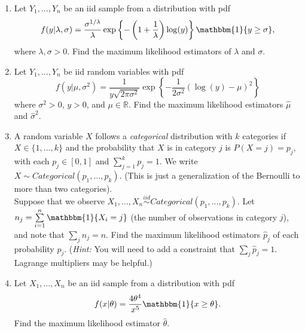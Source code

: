 \documentclass[11pt]{article}
\begin{document}
\begin{enumerate}
\item Let $Y_1,...,Y_n$ be an iid sample from a distribution with pdf 
$$f(y | \lambda, \sigma) = \dfrac{\sigma^{1/\lambda}}{\lambda} \exp \left\lbrace -\left(1 + \frac{1}{\lambda}\right) \log(y) \right\rbrace \mathbbm{1}\{ y \geq \sigma \},$$
where $\lambda, \sigma > 0$. Find the maximum likelihood estimators of $\lambda$ and $\sigma$.\\

\hspace{1cm}

\item Let $Y_1,...,Y_n$ be iid random variables with pdf
$$f(y|\mu, \sigma^2) = \frac{1}{y \sqrt{2 \pi \sigma^2}} \exp \left\lbrace -\frac{1}{2\sigma^2}(\log(y) - \mu)^2 \right\rbrace$$
where $\sigma^2 > 0$, $y > 0$, and $\mu \in \mathbb{R}$. Find the maximum likelihood estimators $\widehat{\mu}$ and $\widehat{\sigma}^2$.\\

\hspace{1cm}

\item A random variable $X$ follows a \textit{categorical} distribution with $k$ categories if $X \in \{1,...,k\}$ and the probability that $X$ is in category $j$ is $P(X = j) = p_j$, with each $p_j \in [0,1]$ and $\sum \limits_{j=1}^k p_j = 1$. We write $X \sim Categorical(p_1,...,p_k)$. (This is just a generalization of the Bernoulli to more than two categories).\\

\noindent Suppose that we observe $X_1,...,X_n \overset{iid}{\sim} Categorical(p_1,...,p_k)$. Let $n_j = \sum \limits_{i=1}^n  \mathbbm{1}\{X_i = j\}$ (the number of observations in category $j$), and note that $\sum_j n_j = n$. Find the maximum likelihood estimators $\widehat{p}_j$ of each probability $p_j$. (\textit{Hint:} You will need to add a constraint that $\sum_j \widehat{p}_j = 1$. Lagrange multipliers may be helpful.)\\

\hspace{1cm}

\item Let $X_1,...,X_n$ be an iid sample from a distribution with pdf
$$f(x|\theta) = \frac{4 \theta^4}{x^5} \mathbbm{1}\{x \geq \theta\}.$$ Find the maximum likelihood estimator $\widehat{\theta}$.

\end{enumerate}
\end{document}
